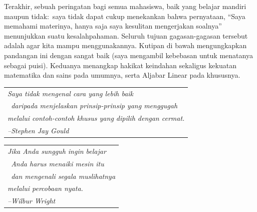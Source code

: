 {Terakhir, sebuah peringatan bagi semua mahasiswa, baik yang belajar mandiri maupun tidak:~saya
tidak dapat cukup menekankan bahwa
pernyataan, ``Saya memahami materinya, hanya saja
saya kesulitan mengerjakan soalnya''\ %
menunjukkan suatu kesalahpahaman.
Seluruh tujuan gagasan-gagasan tersebut adalah agar kita mampu menggunakannya.
Kutipan di bawah mengungkapkan pandangan ini dengan sangat baik
(saya mengambil kebebasan untuk menatanya sebagai puisi).
Keduanya menangkap hakikat keindahan sekaligus kekuatan
matematika dan sains pada umumnya,
serta Aljabar Linear pada khususnya.

\medskip
\par\noindent\begin{tabular}[t]{@{}l@{}}
  \textit{Saya tidak mengenal cara yang lebih baik}                     \\
  \textit{\ daripada menjelaskan prinsip-prinsip yang menggugah} \\
  \textit{melalui contoh-contoh khusus yang dipilih dengan cermat.}                    \\
  \hspace*{1in}\textit{--Stephen Jay Gould}
\end{tabular}

\medskip
\par\noindent
\begin{tabular}[t]{@{}l@{}}   
\textit{Jika Anda sungguh ingin belajar}                     \\
   \textit{\ Anda harus menaiki mesin itu}  \\ 
   \textit{\ dan mengenali segala muslihatnya} \\
   \textit{melalui percobaan nyata.}                    \\
   \hspace*{1in}\textit{--Wilbur Wright}
\end{tabular}


}
